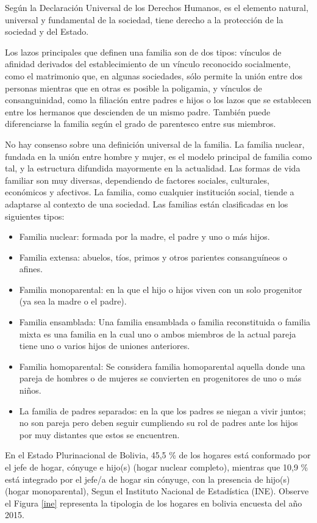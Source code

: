 \documentclass[11pt,letterpaper]{report}
\begin{document}
	Según la Declaración Universal de los Derechos Humanos, es el elemento natural, universal y fundamental de la sociedad, tiene derecho a la protección de la sociedad y del Estado.
	
	Los lazos principales que definen una familia son de dos tipos: vínculos de afinidad derivados del establecimiento de un vínculo reconocido socialmente, como el matrimonio que, en algunas sociedades, sólo permite la unión entre dos personas mientras que en otras es posible la poligamia, y vínculos de consanguinidad, como la filiación entre padres e hijos o los lazos que se establecen entre los hermanos que descienden de un mismo padre. También puede diferenciarse la familia según el grado de parentesco entre sus miembros.
	
	No hay consenso sobre una definición universal de la familia. La familia nuclear, fundada en la unión entre hombre y mujer, es el modelo principal de familia como tal, y la estructura difundida mayormente en la actualidad. Las formas de vida familiar son muy diversas, dependiendo de factores sociales, culturales, económicos y afectivos. La familia, como cualquier institución social, tiende a adaptarse al contexto de una sociedad.
Las familias están clasificadas en los siguientes tipos:
	\begin{itemize}
	\item Familia nuclear: formada por la madre, el padre y uno o más hijos.
	\item Familia extensa: abuelos, tíos, primos y otros parientes consanguíneos o afines.
	\item Familia monoparental: en la que el hijo o hijos viven con un solo progenitor (ya sea la madre o el padre).
	\item Familia ensamblada: Una familia ensamblada o familia reconstituida o familia mixta es una familia en la cual uno o ambos miembros de la actual pareja tiene uno o varios hijos de uniones anteriores.
	\item Familia homoparental: Se considera familia homoparental aquella donde una pareja de hombres o de mujeres se convierten en progenitores de uno o más niños.
	\item La familia de padres separados: en la que los padres se niegan a vivir juntos; no son pareja pero deben seguir cumpliendo su rol de padres ante los hijos por muy distantes que estos se encuentren.
	\end{itemize}
	 En el Estado Plurinacional de Bolivia, 45,5 \% de los hogares está conformado por el jefe de hogar, cónyuge e hijo(s) (hogar nuclear completo), mientras que 10,9 \% está integrado por el jefe/a de hogar sin cónyuge, con la presencia de hijo(s) (hogar monoparental), Segun el Instituto Nacional de Estadística (INE). Observe el Figura \ref{ine} representa la tipologia de los hogares en bolivia encuesta del año 2015. 
\end{document}
